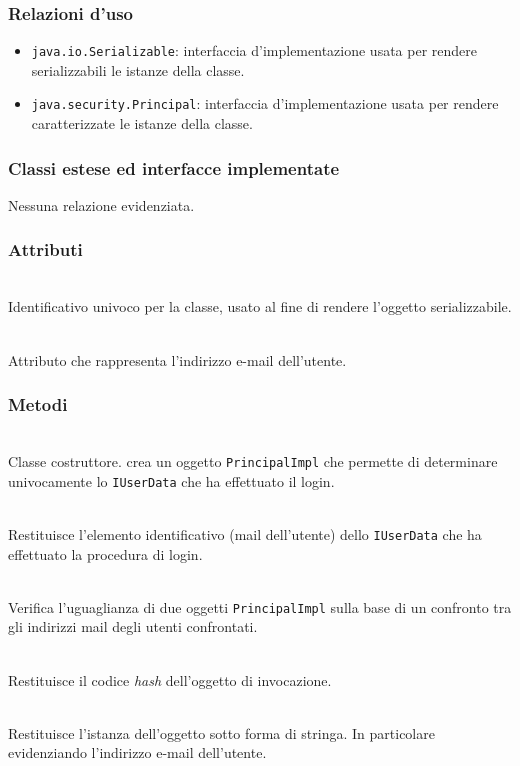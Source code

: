\subsubsection*{Relazioni d'uso}
\begin{itemize}
	\item \texttt{java.io.Serializable}: interfaccia d'implementazione usata per rendere serializzabili le istanze della classe.
	\item \texttt{java.security.Principal}: interfaccia d'implementazione usata per rendere caratterizzate le istanze della classe.
\end{itemize}

\subsubsection*{Classi estese ed interfacce implementate}

Nessuna relazione evidenziata.

\subsubsection*{Attributi}
\begin{description}
  \item{}\\
  Identificativo univoco per la classe, usato al fine di rendere l'oggetto serializzabile.
  \item{}\\
  Attributo che rappresenta l'indirizzo e-mail dell'utente.
\end{description}

\subsubsection*{Metodi}
\begin{description}
	\item{}\\
	Classe costruttore. crea un oggetto \texttt{PrincipalImpl} che permette di determinare univocamente lo \texttt{IUserData} che ha effettuato il login.
	\item{}\\
	Restituisce l'elemento identificativo (mail dell'utente) dello \texttt{IUserData} che ha effettuato la procedura di login.
	\item{}\\
	Verifica l'uguaglianza di due oggetti \texttt{PrincipalImpl} sulla base di un confronto tra gli indirizzi mail degli utenti confrontati.
	\item{}\\
	Restituisce il codice \textit{hash} dell'oggetto di invocazione.				\item{}\\
	Restituisce l'istanza dell'oggetto sotto forma di stringa. In particolare evidenziando l'indirizzo e-mail dell'utente.
\end{description}

